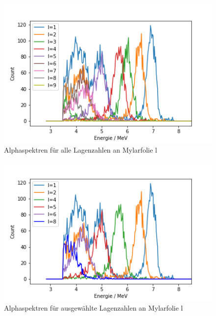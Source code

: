 \begin{figure}[h]
    \centering
    \includegraphics[scale=0.75]{Bilder/lagenAlle.png}
    \caption{Alphaspektren für alle Lagenzahlen an Mylarfolie l}
    \label{bild:lagenAlle}
\end{figure}

\begin{figure}[h]
    \centering
    \includegraphics[scale=0.75]{Bilder/lagenAusgewaehlt.png}
    \caption{Alphaspektren für ausgewählte Lagenzahlen an Mylarfolie l}
    \label{bild:lagenAusgewaehlt}
\end{figure}

\clearpage

